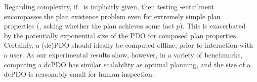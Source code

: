 Regarding complexity, if \plans\ is implicitly given, then testing
\plans-entailment encompasses the plan existence problem even for
extremely simple plan properties (\eg, asking whether the plan
achieves some fact $p$).
%
%
%
%
This is exacerbated by the potentially exponential size of the PDO for
composed plan properties. Certainly, a (dc)PDO should ideally be
computed offline, prior to interaction with a user. As our
experimental results show, however, in a variety of benchmarks,
computing a dcPDO has similar scalability as optimal planning, and the
size of a dcPDO is reasonably small for human inspection.


%
%







